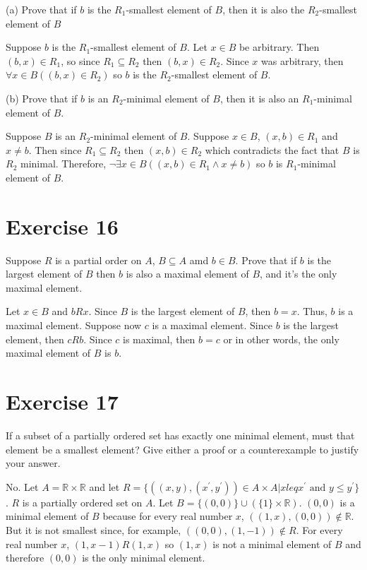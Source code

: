 \documentclass[11pt]{article}
\begin{document}
\noindent (a) Prove that if $b$ is the $R_1$-smallest element of $B$, then it is 
also the $R_2$-smallest element of $B$

Suppose $b$ is the $R_1$-smallest element of $B$. Let $x \in B$ be arbitrary.
Then $(b,x) \in R_1$, so since $R_1 \subseteq R_2$ then $(b,x) \in R_2$. Since 
$x$ was arbitrary, then $\forall x \in B ((b,x) \in R_2)$ so $b$ is the 
$R_2$-smallest element of $B$.

\noindent (b) Prove that if $b$ is an $R_2$-minimal element of $B$, then it is 
also an $R_1$-minimal element of $B$.

Suppose $B$ is an $R_2$-minimal element of $B$. Suppose $x \in B$, $(x,b) \in R_1$
and $x \neq b$. Then since $R_1 \subseteq R_2$ then $(x, b) \in R_2$ which 
contradicts the fact that $B$ is $R_2$ minimal. Therefore, 
$\neg \exists x \in B ((x, b) \in R_1 \wedge x \neq b)$ so $b$ is $R_1$-minimal 
element of $B$. 

\section*{Exercise 16}

Suppose $R$ is a partial order on $A$, $B \subseteq A$ amd $b \in B$. Prove that 
if $b$ is the largest element of $B$ then $b$ is also a maximal element of $B$,
and it's the only maximal element.

Let $x \in B$ and $bRx$. Since $B$ is the largest element of $B$, then $b = x$.
Thus, $b$ is a maximal element. Suppose now $c$ is a maximal element.
Since $b$ is the largest element, then $cRb$. Since $c$ is maximal, then 
$b=c$ or in other words, the only maximal element of $B$ is $b$.

\section*{Exercise 17}

If a subset of a partially ordered set has exactly one minimal element, must 
that element be a smallest element? Give either a proof or a counterexample
to justify your answer.

No. Let $A = \mathbb{R} \times \mathbb{R}$ and let 
$R=\{((x,y), (x^\prime, y^\prime)) \in A \times A | x leq x^\prime \text{ and } y \leq y^\prime\}$.
$R$ is a partially ordered set on $A$. Let $B = \{(0,0)\} \cup (\{1\} \times \mathbb{R})$.
$(0,0)$ is a minimal element of $B$ because for every real number $x$,
$((1,x),(0,0)) \notin \mathbb{R}$. But it is not smallest since, for example,
$((0,0),(1,-1)) \notin R$. For every real number $x$, $(1,x-1)R(1,x)$ so 
$(1,x)$ is not a minimal element of $B$ and therefore $(0,0)$ is the only 
minimal element.
\end{document}
